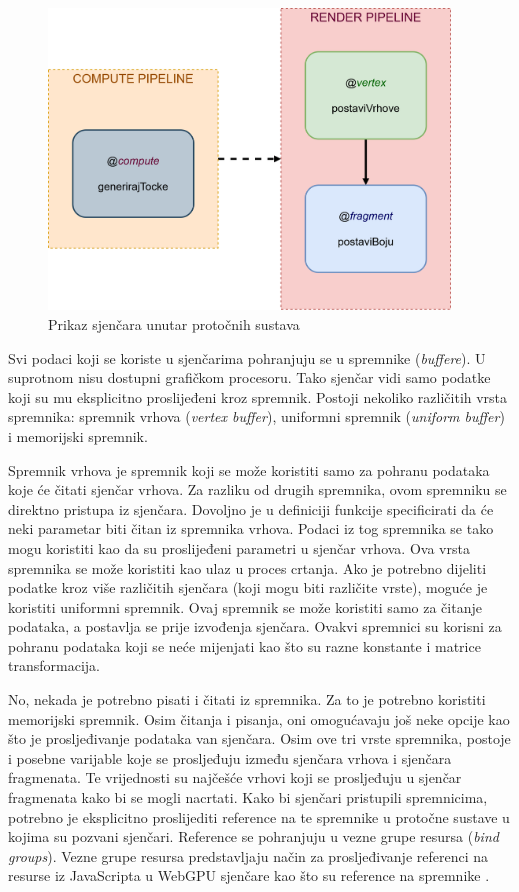 \documentclass{foi}
\begin{document}
\begin{figure}[H]
	\centering
	\includegraphics[width=0.95\textwidth]{slike/38_Pipelines.png}
	\captionsetup{justification=centering}
	\caption{Prikaz sjenčara unutar protočnih sustava}
	\label{fig:Pipelines}
\end{figure}

 
Svi podaci koji se koriste u sjenčarima pohranjuju se u spremnike (\textit{buffere}). U suprotnom nisu dostupni grafičkom procesoru. Tako sjenčar vidi samo podatke koji su mu eksplicitno proslijeđeni kroz spremnik. Postoji nekoliko različitih vrsta spremnika: spremnik vrhova (\textit{vertex buffer}), uniformni spremnik (\textit{uniform buffer}) i memorijski spremnik. 

Spremnik vrhova je spremnik koji se može koristiti samo za pohranu podataka koje će čitati sjenčar vrhova. Za razliku od drugih spremnika, ovom spremniku se direktno pristupa iz sjenčara. Dovoljno je u definiciji funkcije specificirati da će neki parametar biti čitan iz spremnika vrhova. Podaci iz tog spremnika se tako mogu koristiti kao da su proslijeđeni parametri u sjenčar vrhova. Ova vrsta spremnika se može koristiti kao ulaz u proces crtanja. Ako je potrebno dijeliti podatke kroz više različitih sjenčara (koji mogu biti različite vrste), moguće je koristiti uniformni spremnik. Ovaj spremnik se može koristiti samo za čitanje podataka, a postavlja se prije izvođenja sjenčara. Ovakvi spremnici su korisni za pohranu podataka koji se neće mijenjati kao što su razne konstante i matrice transformacija.

 No, nekada je potrebno pisati i čitati iz spremnika. Za to je potrebno koristiti memorijski spremnik. Osim čitanja i pisanja, oni omogućavaju još neke opcije kao što je prosljeđivanje podataka van sjenčara.  Osim ove tri vrste spremnika, postoje i posebne varijable koje se prosljeđuju između sjenčara vrhova i sjenčara fragmenata. Te vrijednosti su najčešće vrhovi koji se prosljeđuju u sjenčar fragmenata kako bi se mogli nacrtati. Kako bi sjenčari pristupili spremnicima, potrebno je eksplicitno proslijediti reference na te spremnike u protočne sustave u kojima su pozvani sjenčari. Reference se pohranjuju u vezne grupe resursa (\textit{bind groups}). Vezne grupe resursa predstavljaju način za prosljeđivanje referenci na resurse iz JavaScripta u WebGPU sjenčare kao što su reference na spremnike \parencite{BufferTypes}. 
\end{document}
